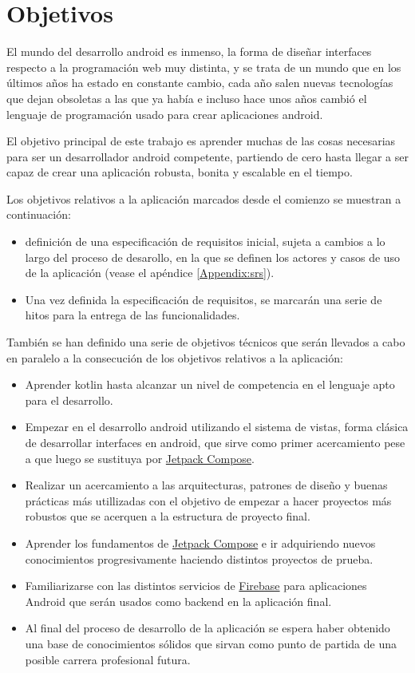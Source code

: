 \section{Objetivos}
El mundo del desarrollo android es inmenso, la forma de diseñar interfaces respecto a la programación web muy distinta, y se trata de un mundo que en los últimos años ha estado en constante cambio, cada año salen nuevas tecnologías que dejan obsoletas a las que ya había e incluso hace unos años cambió el lenguaje de programación usado para crear aplicaciones android.

El objetivo principal de este trabajo es aprender muchas de las cosas necesarias para ser un desarrollador android competente, partiendo de cero hasta llegar a ser capaz de crear una aplicación robusta, bonita y escalable en el tiempo. 

Los objetivos relativos a la aplicación marcados desde el comienzo se muestran a continuación:
\begin{itemize}
	\item definición de una especificación de requisitos inicial, sujeta a cambios a lo largo del proceso de desarollo, en la que se definen los actores y casos de uso de la aplicación (vease el apéndice \ref{Appendix:srs}).
	\item Una vez definida la especificación de requisitos, se marcarán una serie de hitos para la entrega de las funcionalidades.
\end{itemize}

También se han definido una serie de objetivos técnicos que serán llevados a cabo en paralelo a la consecución de los objetivos relativos a la aplicación:
\begin{itemize}
	\item Aprender kotlin hasta alcanzar un nivel de competencia en el lenguaje apto para el desarrollo.
	\item Empezar en el desarrollo android utilizando el sistema de vistas, forma clásica de desarrollar interfaces en android, que sirve como primer acercamiento pese a que luego se sustituya por \hyperlink{subsec:compose}{Jetpack Compose}. 
	\item Realizar un acercamiento a las arquitecturas, patrones de diseño y buenas prácticas más utillizadas con el objetivo de empezar a hacer proyectos más robustos que se acerquen a la estructura de proyecto final.
	\item Aprender los fundamentos de \hyperlink{subsec:compose}{Jetpack Compose} e ir adquiriendo nuevos conocimientos progresivamente haciendo distintos proyectos de prueba.
	\item Familiarizarse con las distintos servicios de \hyperlink{subsec:firebase}{Firebase} para aplicaciones Android que serán usados como backend en la aplicación final.
	\item Al final del proceso de desarrollo de la aplicación se espera haber obtenido una base de conocimientos sólidos que sirvan como punto de partida de una posible carrera profesional futura.
\end{itemize}

